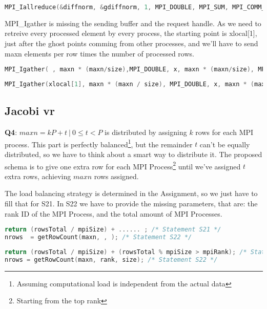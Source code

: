 \documentclass[a4paper, 10pt]{article}
\begin{document}
    \begin{lstlisting}[language=c, caption={Correct S19}]
MPI_Iallreduce(&diffnorm, &gdiffnorm, 1, MPI_DOUBLE, MPI_SUM, MPI_COMM_WORLD, &r[0]); /* S19 */
    \end{lstlisting}

MPI\_Igather is missing the sending buffer and the request handle. As we need to retreive every processed element by every process, the starting point is xlocal[1], just after the ghost points comming from other processes, and we'll have to send maxn elements per row times the number of processed rows.
    \begin{lstlisting}[language=c, caption={Template 20}]
MPI_Igather( , maxn * (maxn/size),MPI_DOUBLE, x, maxn * (maxn/size), MPI_DOUBLE, 0, MPI_COMM_WORLD, &r[ ]); /* S20 */
    \end{lstlisting}

    \begin{lstlisting}[language=c, caption={Correct 20}]
MPI_Igather(xlocal[1], maxn * (maxn / size), MPI_DOUBLE, x, maxn * (maxn / size), MPI_DOUBLE, 0, MPI_COMM_WORLD, &r[0]); /* S20 */
    \end{lstlisting}


\subsection{Jacobi vr}

\textbf{Q4}: $maxn = kP + t \ | \ 0 \leq t < P$ is distributed by assigning $k$ rows for each MPI process. This part is perfectly balanced\footnote{Assuming computational load is independent from the actual data}, but the remainder $t$ can't be equally distributed, so we have to think about a smart way to distribute it. The proposed schema is to give one extra row for each MPI Process\footnote{Starting from the top rank} until we've assigned $t$ extra rows, achieving $maxn$ rows assigned.

The load balancing strategy is determined in the Assignment, so we just have to fill that for S21. In S22 we have to provide the missing parameters, that are: the rank ID of the MPI Process, and the total amount of MPI Processes.
    \begin{lstlisting}[language=c, caption={Template S21, S22}]
return (rowsTotal / mpiSize) + ...... ; /* Statement S21 */
nrows  = getRowCount(maxn, , ); /* Statement S22 */
    \end{lstlisting}

    \begin{lstlisting}[language=c, caption={Correct S21, S22}]
return (rowsTotal / mpiSize) + (rowsTotal % mpiSize > mpiRank); /* Statement S21 */
nrows = getRowCount(maxn, rank, size); /* Statement S22 */
    \end{lstlisting}
\end{document}
